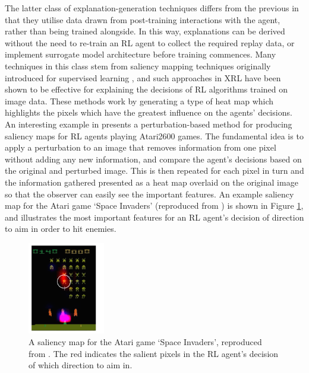 \documentclass{article}
\begin{document}
The latter class of explanation-generation techniques differs from the previous in that they utilise data drawn from post-training interactions with the agent, rather than being trained alongside. In this way, explanations can be derived without the need to re-train an RL agent to collect the required replay data, or implement surrogate model architecture before training commences. Many techniques in this class stem from saliency mapping techniques originally introduced for supervised learning \cite{simonyan2013deep}, and such approaches in XRL have been shown to be effective for explaining the decisions of RL algorithms trained on image data. These methods work by generating a type of heat map which highlights the pixels which have the greatest influence on the agents' decisions. An interesting example in \cite{greydanus2018visualizing} presents a perturbation-based method for producing saliency maps for RL agents playing Atari2600 games. The fundamental idea is to apply a perturbation to an image that removes information from one pixel without adding any new information, and compare the agent's decisions based on the original and perturbed image. This is then repeated for each pixel in turn and the information gathered presented as a heat map overlaid on the original image so that the observer can easily see the important features. An example saliency map for the Atari game `Space Invaders' (reproduced from \cite{greydanus2018visualizing}) is shown in Figure \ref{fig:saliency map}, and illustrates the most important features for an RL agent's decision of direction to aim in order to hit enemies.

\begin{figure}[htp]
    \centering
    \includegraphics[width=0.3\textwidth]{Images/saliency map.png}
    \caption{A saliency map for the Atari game `Space Invaders', reproduced from \cite{greydanus2018visualizing}. The red indicates the salient pixels in the RL agent's decision of which direction to aim in.}
    \label{fig:saliency map}
\end{figure}
\end{document}
